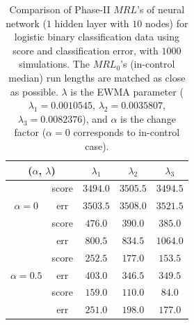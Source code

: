 \documentclass[twoside,11pt]{article}
\begin{document}
\begin{table}[!t]
\centering
\begin{tabular}{ccccc}
\toprule
\multicolumn{2}{c}{($ \alpha$, $ \lambda$)} & {$ \lambda_1$} & {$ \lambda_2$} & {$ \lambda_3$} \\
\midrule
\multirow{3}{*}{$\alpha=0$} & score &$3494.0$ & $3505.5$ & $3494.5$ \\
& err &$3503.5$ & $3508.0$ & $3521.5$ \\
\midrule
\multirow{3}{*}{$\alpha=0.3$} & score &$\bm{476.0}$ & $\bm{390.0}$ & $\bm{385.0}$ \\
& err &$800.5$ & $834.5$ & $1064.0$ \\
\midrule
\multirow{3}{*}{$\alpha=0.5$} & score &$\bm{252.5}$ & $\bm{177.0}$ & $\bm{153.5}$ \\
& err &$403.0$ & $346.5$ & $349.5$ \\
\midrule
\multirow{3}{*}{$\alpha=0.7$} & score &$\bm{159.0}$ & $\bm{110.0}$ & $\bm{84.0}$ \\
& err &$251.0$ & $198.0$ & $177.0$ \\
\midrule
\end{tabular}
\caption{Comparison of Phase-II $MRL$'s of neural network ($1$ hidden layer with $10$ nodes) for logistic binary classification data using score and classification error, with $1000$ simulations. The $MRL_0$'s (in-control median) run lengths are matched as close as possible. $ \lambda$ is the EWMA parameter ({$ \lambda_1=0.0010545$}, {$ \lambda_2=0.0035807$}, {$ \lambda_3=0.0082376$}), and $ \alpha$ is the change factor ($ \alpha=0$ corresponds to in-control case).}
\label{tab:logi_nnet_MRL}
\end{table}
\end{document}
